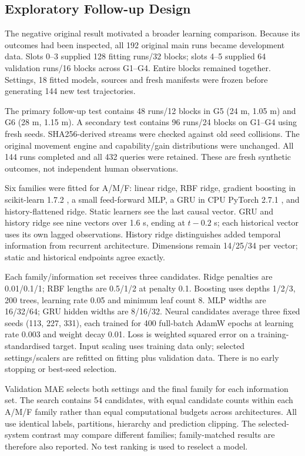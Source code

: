 \subsection{Exploratory Follow-up Design}
The negative original result motivated a broader learning comparison. Because its outcomes had been inspected, all 192 original main runs became development data. Slots 0--3 supplied 128 fitting runs/32 blocks; slots 4--5 supplied 64 validation runs/16 blocks across G1--G4. Entire blocks remained together. Settings, 18 fitted models, sources and fresh manifests were frozen before generating 144 new test trajectories.

The primary follow-up test contains 48 runs/12 blocks in G5 (24 m, 1.05 m) and G6 (28 m, 1.15 m). A secondary test contains 96 runs/24 blocks on G1--G4 using fresh seeds. SHA256-derived streams were checked against old seed collisions. The original movement engine and capability/gain distributions were unchanged. All 144 runs completed and all 432 queries were retained. These are fresh synthetic outcomes, not independent human observations.

Six families were fitted for A/M/F: linear ridge, RBF ridge, gradient boosting in scikit-learn 1.7.2 \cite{SKLEARN}, a small feed-forward MLP, a GRU in CPU PyTorch 2.7.1 \cite{TORCH}, and history-flattened ridge. Static learners see the last causal vector. GRU and history ridge see nine vectors over 1.6 s, ending at $t-0.2$ s; each historical vector uses its own lagged observations. History ridge distinguishes added temporal information from recurrent architecture. Dimensions remain 14/25/34 per vector; static and historical endpoints agree exactly.

Each family/information set receives three candidates. Ridge penalties are 0.01/0.1/1; RBF lengths are 0.5/1/2 at penalty 0.1. Boosting uses depths 1/2/3, 200 trees, learning rate 0.05 and minimum leaf count 8. MLP widths are 16/32/64; GRU hidden widths are 8/16/32. Neural candidates average three fixed seeds (113, 227, 331), each trained for 400 full-batch AdamW epochs at learning rate 0.003 and weight decay 0.01. Loss is weighted squared error on a training-standardised target. Input scaling uses training data only; selected settings/scalers are refitted on fitting plus validation data. There is no early stopping or best-seed selection.

Validation MAE selects both settings and the final family for each information set. The search contains 54 candidates, with equal candidate counts within each A/M/F family rather than equal computational budgets across architectures. All use identical labels, partitions, hierarchy and prediction clipping. The selected-system contrast may compare different families; family-matched results are therefore also reported. No test ranking is used to reselect a model.


